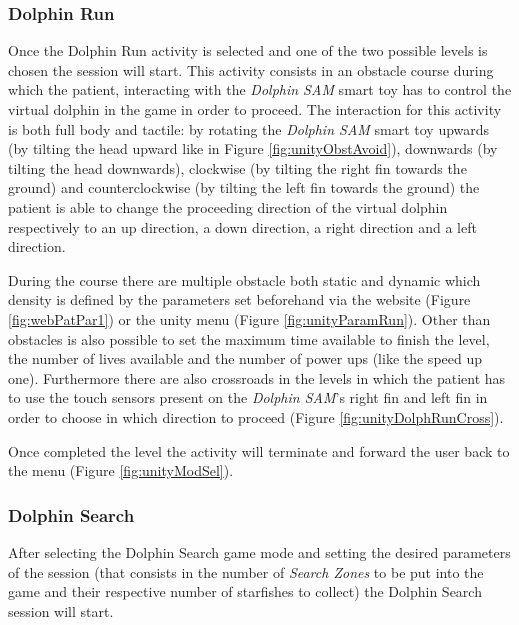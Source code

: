 \subsubsection{Dolphin Run}
Once the Dolphin Run activity is selected and one of the two possible levels is chosen the session will start.
This activity consists in an obstacle course during which the patient, interacting with the \textit{Dolphin SAM} smart toy has to control the virtual dolphin in the game in order to proceed.
The interaction for this activity is both full body and tactile: by rotating the \textit{Dolphin SAM} smart toy upwards (by tilting the head upward like in Figure \ref{fig:unityObstAvoid}), downwards (by tilting the head downwards), clockwise (by tilting the right fin towards the ground) and counterclockwise (by tilting the left fin towards the ground) the patient is able to change the proceeding direction of the virtual dolphin respectively to an up direction, a down direction, a right direction and a left direction.

During the course there are multiple obstacle both static and dynamic which density is defined by the parameters set beforehand via the website (Figure \ref{fig:webPatPar1}) or the unity menu (Figure \ref{fig:unityParamRun}). Other than obstacles is also possible to set the maximum time available to finish the level, the number of lives available and the number of power ups (like the speed up one).
 Furthermore there are also crossroads in the levels in which the patient has to use the touch sensors present on the \textit{Dolphin SAM}'s right fin and left fin in order to choose in which direction to proceed (Figure \ref{fig:unityDolphRunCross}).

Once completed the level the activity will terminate and forward the user back to the menu (Figure \ref{fig:unityModSel}).
\subsubsection{Dolphin Search}
After selecting the Dolphin Search game mode and setting the desired parameters of the session (that consists in the number of \textit{Search Zones} to be put into the game and their respective number of starfishes to collect) the Dolphin Search session will start.

